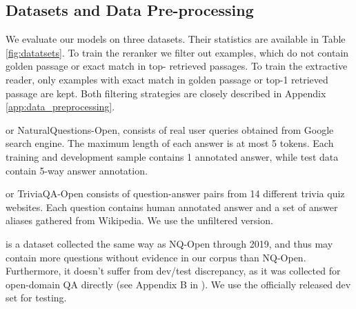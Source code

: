 \documentclass[11pt,a4paper]{article}
\begin{document}
\subsection{Datasets and Data Pre-processing}

We evaluate our models on three datasets. Their statistics are available in Table \ref{fig:datatsets}. To train the reranker we filter out examples, which do not contain golden passage or exact match in top- retrieved passages. 
To train the extractive reader, only examples with exact match in golden passage or top-1 retrieved passage are kept. Both filtering strategies are closely described in Appendix \ref{app:data_preprocessing}.


\begin{description}[style=unboxed,leftmargin=0em,listparindent=\parindent]
\setlength\parskip{0em}
\item[NQ-Open] \cite{kwiatkowski2019natural, lee-etal-2019-latent} or NaturalQuestions-Open, consists of real user queries obtained from Google search engine. The maximum length of each answer is at most 5 tokens. Each training and development sample contains 1 annotated answer, while test data contain 5-way answer annotation.

\item[TQ-Open] \cite{joshi-etal-2017-triviaqa} or TriviaQA-Open consists of question-answer pairs from 14 different trivia quiz websites. Each question contains human annotated answer and a set of answer aliases gathered from Wikipedia. We use the unfiltered version.

\item[EfficientQA] \cite{min2021neurips} is a dataset collected the same way as NQ-Open through 2019, and thus may contain more questions without evidence in our corpus than NQ-Open. Furthermore, it doesn't suffer from dev/test discrepancy, as it was collected for open-domain QA directly (see Appendix B in \citet{min2020ambigqa}). We use the officially released dev set for testing.


\end{description}
\end{document}
